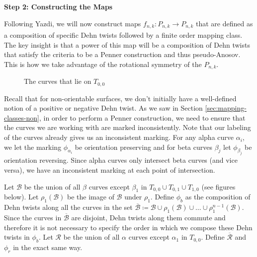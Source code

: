 \begin{center}
\textbf{Step 2: Constructing the Maps}
\end{center}


Following Yazdi, we will now construct maps $f_{n,k}: P_{n,k} \xrightarrow[]{} P_{n,k}$ that are defined as a composition of specific Dehn twists followed by a finite order mapping class. The key insight is that a power of this map will be a composition of Dehn twists that satisfy the criteria to be a Penner construction and thus pseudo-Anosov. This is how we take advantage of the rotational symmetry of the $P_{n,k}$.

\begin{figure}[h]
    \centering
    \caption{The curves that lie on $T_{0,0}$}
    \label{fig:curves}
\end{figure}


Recall that for non-orientable surfaces, we don't initially have a well-defined notion of a positive or negative Dehn twist. As we saw in Section \ref{sec:mapping-classes-non}, in order to perform a Penner construction, we need to ensure that the curves we are working with are marked inconsistently. Note that our labeling of the curves already gives us an inconsistent marking. For any alpha curve $\alpha_i$, we let the marking $\phi_{\alpha_i}$ be orientation preserving and for beta curves $\beta_j$ let $\phi_{\beta_j}$ be orientation reversing. Since alpha curves only intersect beta curves (and vice versa), we have an inconsistent marking at each point of intersection.

Let $\mathcal{B}$ be the union of all $\beta$ curves except $\beta_1$ in $T_{0,0} \cup T_{0,1} \cup T_{1,0}$ (see figures below). Let $\rho_1(\mathcal{B})$ be the image of $\mathcal{B}$ under $\rho_1$. Define $\phi_b$ as the composition of Dehn twists along all the curves in the set $\overline{\mathcal{B}} \coloneqq \mathcal{B} \cup \rho_1(\mathcal{B}) \cup \dots \cup \rho_1^{n-1}(\mathcal{B})$. Since the curves in $\overline{\mathcal{B}}$ are disjoint, Dehn twists along them commute and therefore it is not necessary to specify the order in which we compose these Dehn twists in $\phi_b$. Let $\mathcal{R}$ be the union of all $\alpha$ curves except $\alpha_1$ in $T_{0,0}$. Define $\overline{\mathcal{R}}$ and $\phi_r$ in the exact same way.

